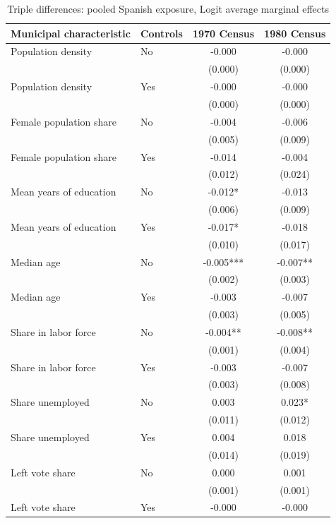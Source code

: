 \begin{table}[!htbp]
\normalsize
\renewcommand{\arraystretch}{1.25}
\setlength{\tabcolsep}{6pt}
\centering
\caption{Triple differences: pooled Spanish exposure, Logit average marginal effects}
\label{tab:triple_pooled_share_ame_stata}
\setlength{\tabcolsep}{4pt}
\captionsetup{justification=centering}
\begin{tabular}{llcc}
\hline
Municipal characteristic & Controls & 1970 Census & 1980 Census \\
\hline
Population density & No & -0.000 & -0.000 \\
 & & (0.000) & (0.000) \\
Population density & Yes & -0.000 & -0.000 \\
 & & (0.000) & (0.000) \\
\addlinespace
Female population share & No & -0.004 & -0.006 \\
 & & (0.005) & (0.009) \\
Female population share & Yes & -0.014 & -0.004 \\
 & & (0.012) & (0.024) \\
\addlinespace
Mean years of education & No & -0.012* & -0.013 \\
 & & (0.006) & (0.009) \\
Mean years of education & Yes & -0.017* & -0.018 \\
 & & (0.010) & (0.017) \\
\addlinespace
Median age & No & -0.005*** & -0.007** \\
 & & (0.002) & (0.003) \\
Median age & Yes & -0.003 & -0.007 \\
 & & (0.003) & (0.005) \\
\addlinespace
Share in labor force & No & -0.004** & -0.008** \\
 & & (0.001) & (0.004) \\
Share in labor force & Yes & -0.003 & -0.007 \\
 & & (0.003) & (0.008) \\
\addlinespace
Share unemployed & No & 0.003 & 0.023* \\
 & & (0.011) & (0.012) \\
Share unemployed & Yes & 0.004 & 0.018 \\
 & & (0.014) & (0.019) \\
\addlinespace
Left vote share & No & 0.000 & 0.001 \\
 & & (0.001) & (0.001) \\
Left vote share & Yes & -0.000 & -0.000 \\

\end{tabular}
\end{table}
